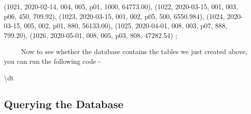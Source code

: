 \documentclass[
  letterpaper,
  DIV=11,
  numbers=noendperiod]{scrreprt}
\newenvironment{Shaded}{\begin{snugshade}}{\end{snugshade}}
\newcommand{\DecValTok}[1]{\textcolor[rgb]{0.68,0.00,0.00}{#1}}
\newcommand{\FloatTok}[1]{\textcolor[rgb]{0.68,0.00,0.00}{#1}}
\newcommand{\NormalTok}[1]{\textcolor[rgb]{0.00,0.23,0.31}{#1}}
\newcommand{\StringTok}[1]{\textcolor[rgb]{0.13,0.47,0.30}{#1}}
\begin{document}
\begin{Shaded}
\begin{Highlighting}[]
\NormalTok{(}\DecValTok{1021}\NormalTok{, }\StringTok{\textquotesingle{}2020{-}02{-}14\textquotesingle{}}\NormalTok{, }\DecValTok{004}\NormalTok{, }\DecValTok{005}\NormalTok{, }\StringTok{\textquotesingle{}p01\textquotesingle{}}\NormalTok{, }\DecValTok{1000}\NormalTok{, }\FloatTok{64773.00}\NormalTok{),}
\NormalTok{(}\DecValTok{1022}\NormalTok{, }\StringTok{\textquotesingle{}2020{-}03{-}15\textquotesingle{}}\NormalTok{, }\DecValTok{001}\NormalTok{, }\DecValTok{003}\NormalTok{, }\StringTok{\textquotesingle{}p06\textquotesingle{}}\NormalTok{, }\DecValTok{450}\NormalTok{, }\FloatTok{709.92}\NormalTok{),}
\NormalTok{(}\DecValTok{1023}\NormalTok{, }\StringTok{\textquotesingle{}2020{-}03{-}15\textquotesingle{}}\NormalTok{, }\DecValTok{001}\NormalTok{, }\DecValTok{002}\NormalTok{, }\StringTok{\textquotesingle{}p05\textquotesingle{}}\NormalTok{, }\DecValTok{500}\NormalTok{, }\FloatTok{6550.984}\NormalTok{),}
\NormalTok{(}\DecValTok{1024}\NormalTok{, }\StringTok{\textquotesingle{}2020{-}03{-}15\textquotesingle{}}\NormalTok{, }\DecValTok{005}\NormalTok{, }\DecValTok{002}\NormalTok{, }\StringTok{\textquotesingle{}p01\textquotesingle{}}\NormalTok{, }\DecValTok{880}\NormalTok{, }\FloatTok{56133.00}\NormalTok{),}
\NormalTok{(}\DecValTok{1025}\NormalTok{, }\StringTok{\textquotesingle{}2020{-}04{-}01\textquotesingle{}}\NormalTok{, }\DecValTok{008}\NormalTok{, }\DecValTok{003}\NormalTok{, }\StringTok{\textquotesingle{}p07\textquotesingle{}}\NormalTok{, }\DecValTok{888}\NormalTok{, }\FloatTok{799.20}\NormalTok{),}
\NormalTok{(}\DecValTok{1026}\NormalTok{, }\StringTok{\textquotesingle{}2020{-}05{-}01\textquotesingle{}}\NormalTok{, }\DecValTok{008}\NormalTok{, }\DecValTok{005}\NormalTok{, }\StringTok{\textquotesingle{}p03\textquotesingle{}}\NormalTok{, }\DecValTok{808}\NormalTok{, }\FloatTok{47282.54}\NormalTok{)}
\NormalTok{;}
\end{Highlighting}
\end{Shaded}

~~~~~Now to see whether the database contains the tables we just created
above, you can run the following code -

\begin{Shaded}
\begin{Highlighting}[]
\NormalTok{\textbackslash{}dt}
\end{Highlighting}
\end{Shaded}

\subsection{Querying the Database}\label{querying-the-database}
\end{document}
